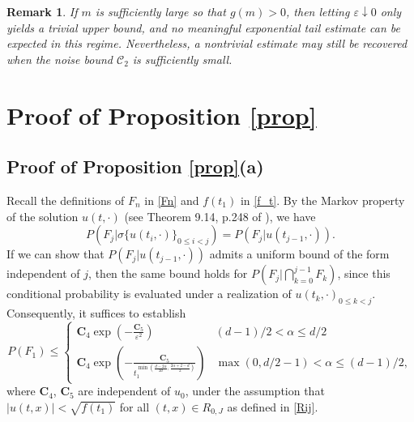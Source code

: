 \documentclass[12pt]{amsart}
\newtheorem{remark}{Remark}[section]
\numberwithin{equation}{section}
\newcommand{\1}{\mathbf{1}}
\begin{document}
\begin{remark}
\label{largeremark}
If $m$ is sufficiently large so that $g(m)>0$, then letting $\varepsilon\downarrow0$ only yields a trivial upper bound, and no meaningful exponential tail estimate can be expected in this regime. Nevertheless, a nontrivial estimate may still be recovered when the noise bound $\mathcal{C}_2$ is sufficiently small.
\end{remark}

\section{Proof of Proposition \ref{prop}}
\label{proofprop}
\subsection*{Proof of Proposition \ref{prop}(a)} Recall the definitions of $F_n$ in \eqref{Fn} and $f(t_1)$ in \eqref{f_t}. By the Markov property of the solution $u(t,\cdot)$ (see Theorem 9.14, p.248 of \cite{da2014stochastic}), we have
\begin{equation*}
P\left(F_{j}\vert\sigma\{u(t_i,\cdot)\}_{0\leq i<j}\right)=P\left(F_{j}\vert u(t_{j-1},\cdot)\right).
\end{equation*}
If we can show that $P\left(F_{j}\vert u(t_{j-1},\cdot)\right)$ admits a uniform bound of the form independent of $j$, then the same bound holds for $P\left(F_{j}\Big\vert \bigcap\limits_{k=0}^{j-1}F_{k}\right)$, since this conditional probability is evaluated under a realization of ${u(t_k,\cdot)}_{0\le k<j}$. Consequently, it suffices to establish
\begin{equation}
\label{F1}
P(F_1)\leq \begin{cases}
    \textbf{C}_4\exp\left(-\frac{\textbf{C}_5}{\varepsilon^2}\right)&(d-1)/2<\alpha\leq d/2\\
    \textbf{C}_4\exp\left(-\frac{\textbf{C}_5}{t_1^{\min\left(\frac{d-2\alpha}{2d},\frac{2\alpha+2-d}{2}\right)}}\right)&\max(0,d/2-1)<\alpha\leq(d-1)/2,
    \end{cases}
\end{equation}
where $\textbf{C}_4$, $\textbf{C}_5$ are independent of $u_0$, under the assumption that $\vert u(t,x)\vert < \sqrt{f(t_1)}$ for all $(t,x)\in R_{0,J}$ as defined in \eqref{Rij}. 
\end{document}
